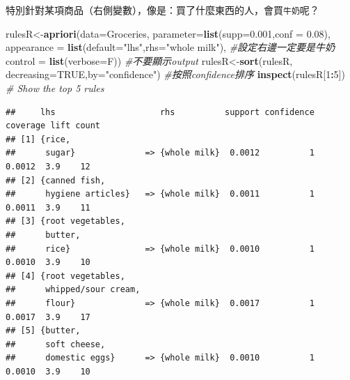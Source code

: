 \documentclass[
]{book}
\newenvironment{Shaded}{\begin{snugshade}}{\end{snugshade}}
\newcommand{\CommentTok}[1]{\textcolor[rgb]{0.56,0.35,0.01}{\textit{#1}}}
\newcommand{\DataTypeTok}[1]{\textcolor[rgb]{0.13,0.29,0.53}{#1}}
\newcommand{\DecValTok}[1]{\textcolor[rgb]{0.00,0.00,0.81}{#1}}
\newcommand{\FloatTok}[1]{\textcolor[rgb]{0.00,0.00,0.81}{#1}}
\newcommand{\KeywordTok}[1]{\textcolor[rgb]{0.13,0.29,0.53}{\textbf{#1}}}
\newcommand{\NormalTok}[1]{#1}
\newcommand{\OperatorTok}[1]{\textcolor[rgb]{0.81,0.36,0.00}{\textbf{#1}}}
\newcommand{\OtherTok}[1]{\textcolor[rgb]{0.56,0.35,0.01}{#1}}
\newcommand{\StringTok}[1]{\textcolor[rgb]{0.31,0.60,0.02}{#1}}
\begin{document}
特別針對某項商品（右側變數），像是：買了什麼東西的人，會買\texttt{牛奶}呢？

\begin{Shaded}
\begin{Highlighting}[]
\NormalTok{rulesR<-}\KeywordTok{apriori}\NormalTok{(}\DataTypeTok{data=}\NormalTok{Groceries, }\DataTypeTok{parameter=}\KeywordTok{list}\NormalTok{(}\DataTypeTok{supp=}\FloatTok{0.001}\NormalTok{,}\DataTypeTok{conf =} \FloatTok{0.08}\NormalTok{),}
        \DataTypeTok{appearance =} \KeywordTok{list}\NormalTok{(}\DataTypeTok{default=}\StringTok{"lhs"}\NormalTok{,}\DataTypeTok{rhs=}\StringTok{"whole milk"}\NormalTok{), }\CommentTok{#設定右邊一定要是牛奶}
        \DataTypeTok{control =} \KeywordTok{list}\NormalTok{(}\DataTypeTok{verbose=}\NormalTok{F)) }\CommentTok{#不要顯示output}
\NormalTok{rulesR<-}\KeywordTok{sort}\NormalTok{(rulesR, }\DataTypeTok{decreasing=}\OtherTok{TRUE}\NormalTok{,}\DataTypeTok{by=}\StringTok{"confidence"}\NormalTok{) }\CommentTok{#按照confidence排序}
\KeywordTok{inspect}\NormalTok{(rulesR[}\DecValTok{1}\OperatorTok{:}\DecValTok{5}\NormalTok{]) }\CommentTok{# Show the top 5 rules}
\end{Highlighting}
\end{Shaded}

\begin{verbatim}
##     lhs                     rhs          support confidence coverage lift count
## [1] {rice,                                                                     
##      sugar}              => {whole milk}  0.0012          1   0.0012  3.9    12
## [2] {canned fish,                                                              
##      hygiene articles}   => {whole milk}  0.0011          1   0.0011  3.9    11
## [3] {root vegetables,                                                          
##      butter,                                                                   
##      rice}               => {whole milk}  0.0010          1   0.0010  3.9    10
## [4] {root vegetables,                                                          
##      whipped/sour cream,                                                       
##      flour}              => {whole milk}  0.0017          1   0.0017  3.9    17
## [5] {butter,                                                                   
##      soft cheese,                                                              
##      domestic eggs}      => {whole milk}  0.0010          1   0.0010  3.9    10
\end{verbatim}
\end{document}
